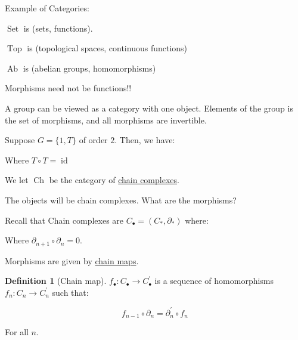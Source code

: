 \documentclass{article}
\theoremstyle{definition}
\newtheorem*{definition}{Definition}
\begin{document}
    Example of Categories:

    \(\operatorname{Set}\) is (sets, functions).

    \(\operatorname{Top}\) is (topological spaces, continuous functions)

    \(\operatorname{Ab}\) is (abelian groups, homomorphisms)

    Morphisms need not be functions!!

    A group can be viewed as a category with one object. Elements of the group is the set of morphisms, and all morphisms are invertible.

    Suppose \(G = \{ 1,T \}\) of order \(2\). Then, we have:

    \begin{center}
    \end{center}

    Where \(T \circ T = \operatorname{id}\) 

    We let \(\operatorname{Ch}\) be the category of \underline{chain complexes}.

    The objects will be chain complexes. What are the morphisms?

    Recall that Chain complexes are \(C_\bullet = (C_{\ast} , \partial_{\ast})\) where:

    \begin{center}
    \end{center}

    Where \(\partial_{n+1} \circ \partial_n = 0\).
    
    Morphisms are given by \underline{chain maps}.

    \begin{definition}
        [Chain map] \(f_\bullet: C_\bullet \to C_\bullet^{\prime}\) is a sequence of homomorphisms \(f_n : C_n \to C_n^{\prime}\) such that:

        \[
            f_{n-1} \circ \partial_n = \partial_n^{\prime} \circ f_n
        \]

        For all \(n\).
    \end{definition}
\end{document}
